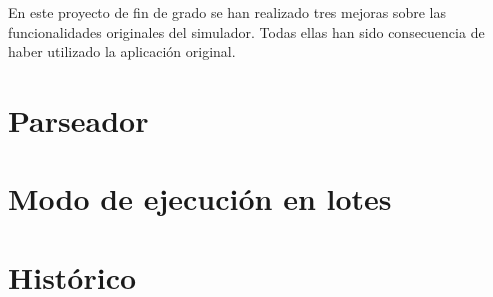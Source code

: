 

En este proyecto de fin de grado se han realizado tres mejoras sobre las 
funcionalidades originales del simulador. Todas ellas han sido consecuencia
de haber utilizado la aplicación original.

\section{Parseador}
\label{6:sec1}


\section{Modo de ejecución en lotes}
\label{6:sec2}


\section{Histórico}
\label{6:sec3}

